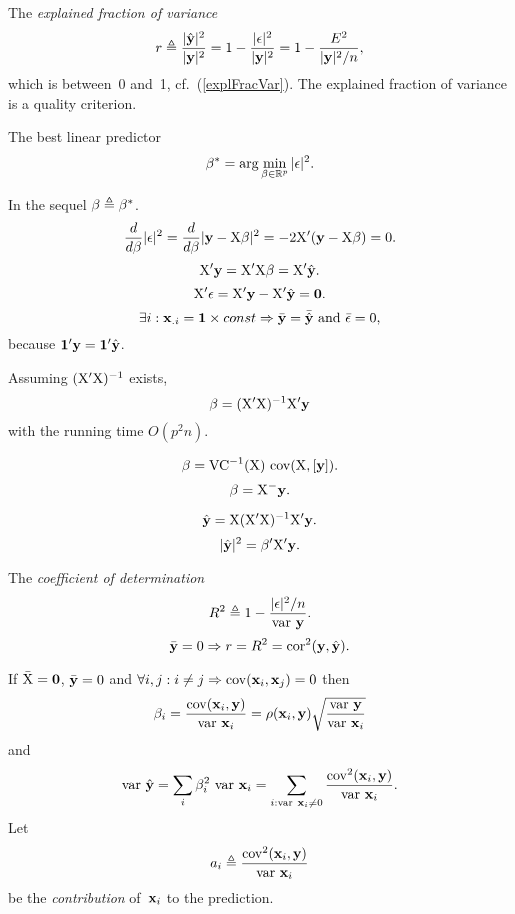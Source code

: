 \documentclass[10pt,a4paper]{article}
\theoremstyle{plain} \newtheorem{Lem}{Lemma}
\begin{document}
The {\em explained fraction of variance} 
$$ r \triangleq \frac {|\hat {\mathbf y}|^2} {|\mathbf y|^2} = 1 - \frac {|\mathbf \epsilon|^2} {|\mathbf y|^2} = 1 - \frac {E^2} {|\mathbf y|^2 / n}, $$ 
which is between~0 and~1, cf.~(\ref{explFracVar}).
The explained fraction of variance is a quality criterion.

The best linear predictor
\begin{equation} \label{betaOpt}
  \mathbf \beta^* = \arg \min_{\mathbf \beta \in \mathbb R^p} |\mathbf \epsilon|^2.
\end{equation}

In the sequel $\mathbf \beta \triangleq \mathbf \beta^*$.
$$ \frac d {d \mathbf \beta} |\mathbf \epsilon|^2 = \frac d {d \mathbf \beta} |\mathbf y - \mathrm X \mathbf \beta|^2 = - 2 \mathrm X' (\mathbf y - \mathrm X \mathbf \beta) = 0. $$
$$ \mathrm X' \mathbf y = \mathrm X' \mathrm X \mathbf \beta = \mathrm X' \hat {\mathbf y}. $$
$$ \mathrm X' \mathbf \epsilon = \mathrm X' \mathbf y - \mathrm X' \hat {\mathbf y} = \mathbf 0. $$
$$ \exists i : \mathbf x_{. i} = \mathbf 1 \times const \Rightarrow \bar{\mathbf y} = \bar{\hat {\mathbf y}} \text{ and } \bar{\mathbf \epsilon} = 0, $$
because $\mathbf 1' \mathbf y = \mathbf 1' \hat {\mathbf y}$.

Assuming $(\mathrm X' \mathrm X)^{-1}$ exists,
\begin{equation} \label{betaL2}
  \mathbf \beta = (\mathrm X' \mathrm X)^{-1} \mathrm X' \mathbf y
\end{equation}
with the running time $O(p^2 n)$.

\begin{equation} \label{betaL2_stat}
   \mathbf \beta = \mathrm {VC}^{-1} (\mathrm X) \ \mathrm {cov}(\mathrm X,[\mathbf y]). 
\end{equation}
$$ \mathbf \beta = \mathrm X^- \mathbf y. $$

$$ \hat {\mathbf y} = \mathrm X (\mathrm X' \mathrm X)^{-1} \mathrm X' \mathbf y. $$
$$ |\hat {\mathbf y}|^2 = \mathbf \beta' \mathrm X' \mathbf y. $$

The {\em coefficient of determination}
$$ R^2 \triangleq 1 - \frac {|\mathbf \epsilon|^2 / n} {\mathrm {var} \  \mathbf y}. $$
$$ \bar {\mathbf y} = 0 \Rightarrow r = R^2 = \mathrm {cor}^2 (\mathbf y, \hat {\mathbf y}). $$

If $\bar {\mathrm X} = \mathbf 0$, $\bar {\mathbf y} = 0$ and $\forall i, j: i \ne j \Rightarrow \mathrm {cov}(\mathbf x_i, \mathbf x_j) = 0$ then 
\begin{equation} \label{betaIndep}
\beta_i = \frac {\mathrm {cov} (\mathbf x_i, \mathbf y)} {\mathrm {var} \  \mathbf x_i} = \rho(\mathbf x_i, \mathbf y) \sqrt{\frac {\mathrm {var} \  \mathbf y} {\mathrm {var} \  \mathbf x_i}}
\end{equation}
and
$$ \mathrm {var} \  \hat {\mathbf y} = \sum_i \beta_i^2 \ \mathrm {var} \  \mathbf x_i = \sum_{i : \mathrm {var} \  \mathbf x_i \ne 0} \frac {\mathrm {cov}^2 (\mathbf x_i, \mathbf y)} {\mathrm {var} \  \mathbf x_i}. $$
Let
$$ a_i \triangleq \frac {\mathrm {cov}^2 (\mathbf x_i, \mathbf y)} {\mathrm {var} \  \mathbf x_i} $$
be the {\em contribution} of~$\mathbf x_i$ to the prediction.
\end{document}
